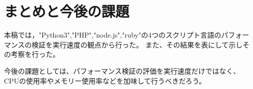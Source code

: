 \chapter{まとめと今後の課題}
\label{cha:conclusion}

 本稿では，"Python3","PHP","node.js","ruby"の4つのスクリプト言語のパフォーマンスの検証を実行速度の観点から行った。
 また、その結果を表にして示しその考察を行った。

 今後の課題としては、パフォーマンス検証の評価を実行速度だけではなく、CPUの使用率やメモリー使用率などを加味して行うべきだろう。